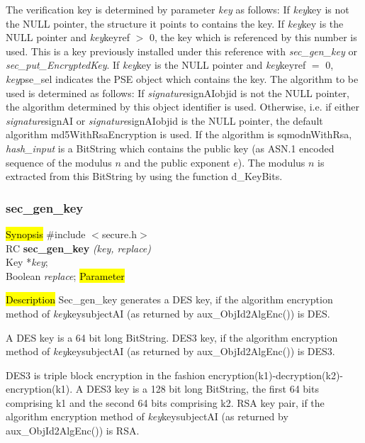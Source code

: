 The verification key is determined by parameter {\em key} as follows:
\be
\m If {\em key}\pf key is not the NULL pointer, the structure it points to
   contains the key.
\m If {\em key}\pf key is the NULL pointer and {\em key}\pf keyref $>$ 0,
   the key which is referenced by this number is used. This is a key
   previously installed under this reference with {\em sec\_gen\_key} or 
   {\em sec\_put\_EncryptedKey}.
\m If {\em key}\pf key is the NULL pointer and {\em key}\pf keyref $=$ 0,
   {\em key}\pf pse\_sel indicates the PSE object which contains the key.
\ee
The algorithm to be used is determined as follows:
\be
\m If {\em signature}\pf signAI\pf objid is not the NULL pointer, the algorithm
   determined by this object identifier is used.
\m Otherwise, i.e. if either {\em signature}\pf signAI or {\em signature}\pf signAI\pf objid 
   is the NULL pointer, the default algorithm
   md5WithRsaEncryption is used.
\ee
If the algorithm is sqmodnWithRsa, {\em hash\_input} is a BitString which contains the 
public key (as ASN.1 encoded sequence of the modulus $n$ and the public
exponent $e$). The modulus $n$ is extracted from this BitString by using the function
d\_KeyBits.

\subsubsection{sec\_gen\_key}
\label{sec_gen_key}
\hl{Synopsis}
\#include $<$secure.h$>$ \\ [0.5cm]
RC {\bf sec\_gen\_key} {\em (key, replace)} \\
Key *{\em key}; \\
Boolean {\em replace};
\hl{Parameter}


\hl{Description}
Sec\_gen\_key generates a
\bi
\m  DES key, 
    if the algorithm encryption method 
    of {\em key}\pf key\pf subjectAI (as returned by aux\_ObjId2AlgEnc()) is DES. 

    A DES key is a 64 bit long BitString.
\m  DES3 key, 
    if the algorithm encryption method 
    of {\em key}\pf key\pf subjectAI (as returned by aux\_ObjId2AlgEnc()) is DES3. 

    DES3 is triple block encryption in the fashion encryption(k1)-decryption(k2)-encryption(k1).
    A DES3 key is a 128 bit long BitString, the first 64 bits comprising k1 and the
    second 64 bits comprising k2.
\m  RSA key pair, 
    if the algorithm encryption method 
    of {\em key}\pf key\pf subjectAI (as returned by aux\_ObjId2AlgEnc()) is RSA. 

